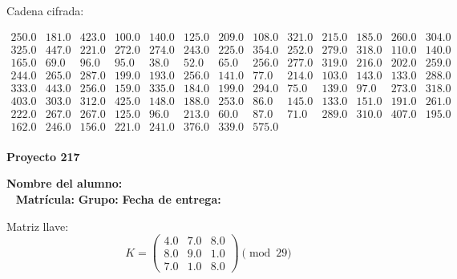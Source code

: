 \documentclass[12pt]{article}
\begin{document}
Cadena cifrada:
\begin{center}
$\begin{array}{lllllllllllll}
250.0 & 181.0 & 423.0 & 100.0 & 140.0 & 125.0 & 209.0 & 108.0 & 321.0 & 215.0 & 185.0 & 260.0 & 304.0\\
325.0 & 447.0 & 221.0 & 272.0 & 274.0 & 243.0 & 225.0 & 354.0 & 252.0 & 279.0 & 318.0 & 110.0 & 140.0\\
165.0 & 69.0 & 96.0 & 95.0 & 38.0 & 52.0 & 65.0 & 256.0 & 277.0 & 319.0 & 216.0 & 202.0 & 259.0\\
244.0 & 265.0 & 287.0 & 199.0 & 193.0 & 256.0 & 141.0 & 77.0 & 214.0 & 103.0 & 143.0 & 133.0 & 288.0\\
333.0 & 443.0 & 256.0 & 159.0 & 335.0 & 184.0 & 199.0 & 294.0 & 75.0 & 139.0 & 97.0 & 273.0 & 318.0\\
403.0 & 303.0 & 312.0 & 425.0 & 148.0 & 188.0 & 253.0 & 86.0 & 145.0 & 133.0 & 151.0 & 191.0 & 261.0\\
222.0 & 267.0 & 267.0 & 125.0 & 96.0 & 213.0 & 60.0 & 87.0 & 71.0 & 289.0 & 310.0 & 407.0 & 195.0\\
162.0 & 246.0 & 156.0 & 221.0 & 241.0 & 376.0 & 339.0 & 575.0\\
\end{array}$
\end{center}

\newpage


\textbf{Proyecto 217}

\textbf{Nombre del alumno:} \underline{\hspace{13cm}}\\\
\vspace{1cm}
\textbf{Matrícula:} \underline{\hspace{4cm}} \hspace{1cm}
\textbf{Grupo:} \underline{\hspace{2cm}}
\textbf{Fecha de entrega:} \underline{\hspace{2cm}}

\medskip

Matriz llave:
\[
K = \begin{pmatrix}
4.0 & 7.0 & 8.0\\
8.0 & 9.0 & 1.0\\
7.0 & 1.0 & 8.0
\end{pmatrix} \pmod{29}
\]
\end{document}
